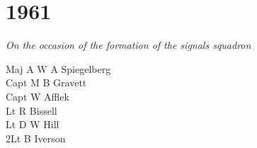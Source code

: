 \chapter*{1961}

\begin{center}
  \textit{On the occasion of the formation of the signals squadron}
\end{center}

\begin{multicols}{2}
  \noindent
  Maj A W A Spiegelberg \\
  Capt M B Gravett \\
  Capt W Afflek \\
  Lt R Bissell \\
  Lt D W Hill \\
  2Lt B Iverson \\
\end{multicols}

